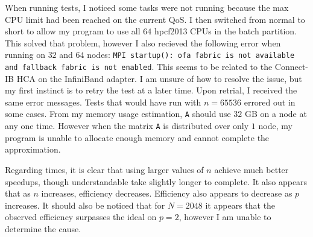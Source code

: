 \documentclass[11pt]{article}
\begin{document}
When running tests, I noticed some tasks were not running because the max CPU limit had been reached on the current QoS. I then switched from normal to short to allow my program to use all $64$ hpcf2013 CPUs in the batch partition. This solved that problem, however I also recieved the following error when running on $32$ and $64$ nodes: \texttt{MPI startup(): ofa fabric is not available and fallback fabric is not enabled}. This seems to be related to the Connect-IB HCA on the InfiniBand adapter. I am unsure of how to resolve the issue, but my first instinct is to retry the test at a later time. Upon retrial, I received the same error messages. Tests that would have run with $n=65536$ errored out in some cases. From my memory usage estimation, \texttt{A} should use $32$ GB on a node at any one time. However when the matrix \texttt{A} is distributed over only $1$ node, my program is unable to allocate enough memory and cannot complete the approximation.

Regarding times, it is clear that using larger values of $n$ achieve much better speedups, though understandable take slightly longer to complete. It also appears that as $n$ increases, efficiency decreases. Efficiency also appears to decrease as $p$ increases. It should also be noticed that for $N=2048$ it appears that the observed efficiency surpasses the ideal on $p=2$, however I am unable to determine the cause.
\end{document}
